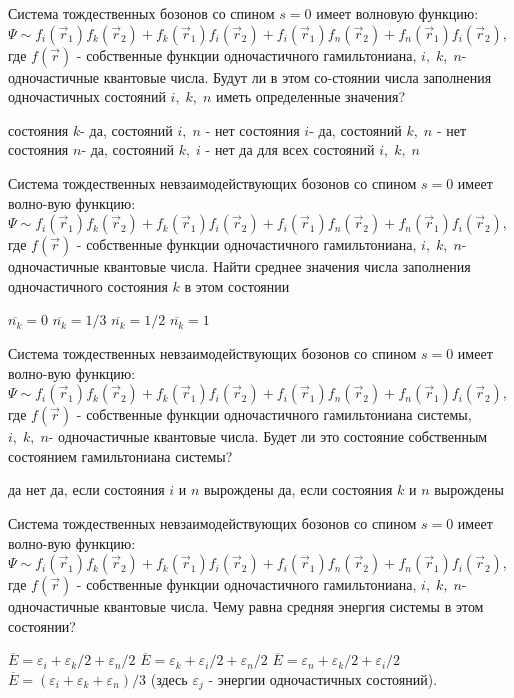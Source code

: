 \documentclass[11pt,a4paper]{exam}
\begin{document}
\begin{questions}
\question Система тождественных бозонов со спином $s = 0$ имеет волновую функцию:
$\Psi  \sim {f_i}({\vec r_1}){f_k}({\vec r_2}) + {f_k}({\vec r_1}){f_i}({\vec r_2}) + {f_i}({\vec r_1}){f_n}({\vec r_2}) + {f_n}({\vec r_1}){f_i}({\vec r_2})$, где $f(\vec r)$ - собственные функции одночастичного гамильтониана, $i,\;k,\;n$- одночастичные квантовые числа. Будут ли в этом со-стоянии числа заполнения одночастичных состояний $i,\;k,\;n$ иметь определенные значения?
\begin{choices}
\choice состояния $k$- да, состояний $i,\;n$ - нет      
\choice состояния $i$- да, состояний $k,\;n$ - нет
\choice состояния $n$- да, состояний $k,\;i$ - нет      
\choice да для всех состояний $i,\;k,\;n$
\end{choices}

\question Система тождественных невзаимодействующих бозонов со спином $s = 0$ имеет волно-вую функцию: $\Psi  \sim {f_i}({\vec r_1}){f_k}({\vec r_2}) + {f_k}({\vec r_1}){f_i}({\vec r_2}) + {f_i}({\vec r_1}){f_n}({\vec r_2}) + {f_n}({\vec r_1}){f_i}({\vec r_2})$, где $f(\vec r)$ - собственные функции одночастичного гамильтониана, $i,\;k,\;n$- одночастичные квантовые числа. Найти среднее значения числа заполнения одночастичного состояния $k$ в этом состоянии
\begin{choices}
\choice $\overline {{n_k}}  = 0$      
\choice $\overline {{n_k}}  = 1/3$    
\choice $\overline {{n_k}}  = 1/2$    
\choice $\overline {{n_k}}  = 1$
\end{choices}

\question Система тождественных невзаимодействующих бозонов со спином $s = 0$ имеет волно-вую функцию: $\Psi  \sim {f_i}({\vec r_1}){f_k}({\vec r_2}) + {f_k}({\vec r_1}){f_i}({\vec r_2}) + {f_i}({\vec r_1}){f_n}({\vec r_2}) + {f_n}({\vec r_1}){f_i}({\vec r_2})$, где $f(\vec r)$ - собственные функции одночастичного гамильтониана системы, $i,\;k,\;n$- одночастичные квантовые числа. Будет ли это состояние собственным состоянием гамильтониана системы?
\begin{choices}
\choice да
\choice нет
\choice да, если состояния $i$ и $n$ вырождены
\choice да, если состояния $k$ и $n$ вырождены 
\end{choices}

\question Система тождественных невзаимодействующих бозонов со спином $s = 0$ имеет волно-вую функцию: $\Psi  \sim {f_i}({\vec r_1}){f_k}({\vec r_2}) + {f_k}({\vec r_1}){f_i}({\vec r_2}) + {f_i}({\vec r_1}){f_n}({\vec r_2}) + {f_n}({\vec r_1}){f_i}({\vec r_2})$, где $f(\vec r)$ - собственные функции одночастичного гамильтониана, $i,\;k,\;n$- одночастичные квантовые числа. Чему равна средняя энергия системы в этом состоянии?
\begin{choices}
\choice $\overline E  = {\varepsilon _i} + {\varepsilon _k}/2 + {\varepsilon _n}/2$      
\choice $\overline E  = {\varepsilon _k} + {\varepsilon _i}/2 + {\varepsilon _n}/2$
\choice $\overline E  = {\varepsilon _n} + {\varepsilon _k}/2 + {\varepsilon _i}/2$      
\choice $\overline E  = ({\varepsilon _i} + {\varepsilon _k} + {\varepsilon _n})/3$
(здесь ${\varepsilon _j}$ - энергии одночастичных состояний).
\end{choices}


\end{questions}
\end{document}
